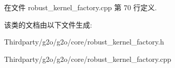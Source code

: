 在文件 robust\-\_\-kernel\-\_\-factory.\-cpp 第 70 行定义.



该类的文档由以下文件生成\-:\begin{DoxyCompactItemize}
\item 
Thirdparty/g2o/g2o/core/robust\-\_\-kernel\-\_\-factory.\-h\item 
Thirdparty/g2o/g2o/core/robust\-\_\-kernel\-\_\-factory.\-cpp\end{DoxyCompactItemize}
